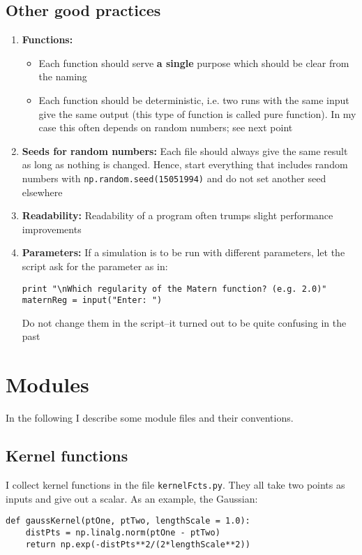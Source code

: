 \documentclass[12pt]{article}
\begin{document}
\subsection{Other good practices}
\begin{enumerate}
\item \textbf{Functions:}
\begin{itemize}
\item Each function should serve \textbf{a single} purpose which should be clear from the naming
\item Each function should be deterministic, i.e. two runs with the same input give the same output (this type of function is called pure function). In my case this often depends on random numbers; see next point
\end{itemize}
\item \textbf{Seeds for random numbers:} Each file should always give the same result as long as nothing is changed. Hence, start everything that includes random numbers with \texttt{np.random.seed(15051994)} and do not set another seed elsewhere
\item \textbf{Readability:} Readability of a program often trumps slight performance improvements
\item \textbf{Parameters:} If a simulation is to be run with different parameters, let the script ask for the parameter as in:
\begin{Verbatim}[formatcom=\color{blue!50!black}]
print "\nWhich regularity of the Matern function? (e.g. 2.0)"
maternReg = input("Enter: ")
\end{Verbatim}
Do not change them in the script--it turned out to be quite confusing in the past
\end{enumerate}

\section{Modules}

In the following I describe some module files and their conventions.



\subsection{Kernel functions}
	\label{subsec:kernelFcts}
I collect kernel functions in the file \texttt{kernelFcts.py}. They all take two points as inputs and give out a scalar. As an example, the Gaussian:
\begin{Verbatim}[formatcom=\color{blue!50!black}]
def gaussKernel(ptOne, ptTwo, lengthScale = 1.0):
    distPts = np.linalg.norm(ptOne - ptTwo)
    return np.exp(-distPts**2/(2*lengthScale**2))
\end{Verbatim}
\end{document}
